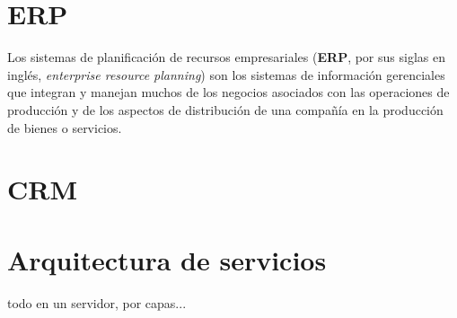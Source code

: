 

\chapter{ERP}
Los sistemas de planificación de recursos empresariales (\textbf{ERP}, por sus siglas en inglés, \textit{enterprise resource planning}) son los sistemas de información gerenciales que integran y manejan muchos de los negocios asociados con las operaciones de producción y de los aspectos de distribución de una compañía en la producción de bienes o servicios.




\chapter{CRM}


\chapter{Arquitectura de servicios}

todo en un servidor, por capas...